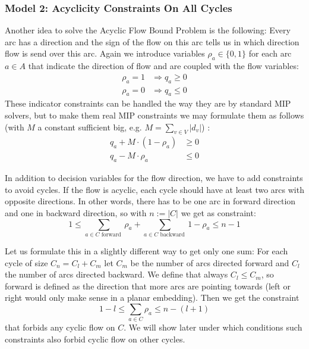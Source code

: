 \subsubsection{Model 2: Acyclicity Constraints On All Cycles}
\label{model:AcyclicityConstraints}
Another idea to solve the Acyclic Flow Bound Problem 
is the following: Every arc has a direction and the 
sign of the flow on this arc tells us in which direction flow is send over this arc. Again we introduce variables 
$\rho_a\in \{0,1\}$ for each arc $a\in A$ that indicate the direction of flow and are coupled with the flow variables:
\begin{align*}
\rho_a=1 & \Rightarrow q_a\ge 0 \\
\rho_a=0 & \Rightarrow q_a\le 0
\end{align*}
These indicator constraints can be handled the way they are by standard MIP solvers, but to make them real MIP 
constraints we may formulate them as follows (with $M$ a constant sufficient big, e.g. $M=\sum_{v\in V}|d_v|$) :
\begin{align*}
 q_a + M\cdot (1-\rho_a) &\ge 0\\
 q_a - M\cdot \rho_a & \le 0
\end{align*}

In addition to decision variables for the flow direction, we have to add constraints to avoid cycles. If the flow is 
acyclic, each cycle should have at least two arcs with opposite directions. In other words, there has to be one arc
in forward direction and one in backward direction, so with $n:=|C|$ we get as constraint:
$$ 1\le\sum_{a\in C\textrm{ forward }} \rho_a + \sum_{a\in C\textrm{ backward }}1-\rho_a\le n-1$$

Let us formulate this in a slightly different way to get only one sum: For each cycle of size $C_n=C_l+C_m$ 
let $C_m$ be the number of arcs directed forward and $C_l$ the number of arcs directed backward. We define that always 
$C_l\le C_m$, so forward is defined as the direction that more arcs are pointing towards (left or right would only 
make sense in a planar embedding). Then we get the constraint $$1-l \le \sum_{a\in C}\rho_a\le n-(l+1)$$ that forbids 
any cyclic flow on $C$. We will show later under which conditions such constraints also forbid cyclic flow on other 
cycles. 

